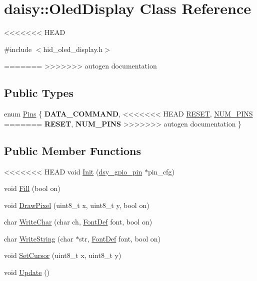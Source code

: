 \hypertarget{classdaisy_1_1_oled_display}{}\section{daisy\+:\+:Oled\+Display Class Reference}
\label{classdaisy_1_1_oled_display}
<<<<<<< HEAD


{\ttfamily \#include $<$hid\+\_\+oled\+\_\+display.\+h$>$}

=======
>>>>>>> autogen documentation
\subsection*{Public Types}
\begin{DoxyCompactItemize}
\item 
enum \hyperlink{classdaisy_1_1_oled_display_ac1e198fa97a58fbe1ff24a06c621c2cf}{Pins} \{ {\bfseries D\+A\+T\+A\+\_\+\+C\+O\+M\+M\+A\+ND}, 
<<<<<<< HEAD
\hyperlink{classdaisy_1_1_oled_display_ac1e198fa97a58fbe1ff24a06c621c2cfa67697d8ab522b9fb584155f838179a4d}{R\+E\+S\+ET}, 
\hyperlink{classdaisy_1_1_oled_display_ac1e198fa97a58fbe1ff24a06c621c2cfaaa81b094c752fe9ddfe072d54003ee1f}{N\+U\+M\+\_\+\+P\+I\+NS}
=======
{\bfseries R\+E\+S\+ET}, 
{\bfseries N\+U\+M\+\_\+\+P\+I\+NS}
>>>>>>> autogen documentation
 \}
\end{DoxyCompactItemize}
\subsection*{Public Member Functions}
\begin{DoxyCompactItemize}
\item 
<<<<<<< HEAD
void \hyperlink{classdaisy_1_1_oled_display_a3db22d3503032fa5f1326009731668e8}{Init} (\hyperlink{structdsy__gpio__pin}{dsy\+\_\+gpio\+\_\+pin} $\ast$pin\+\_\+cfg)
\item 
void \hyperlink{classdaisy_1_1_oled_display_ae0170fddb3afb9b8b008a69ad2578737}{Fill} (bool on)
\item 
void \hyperlink{classdaisy_1_1_oled_display_ad139e5a2b86e1a38cb07693488839a59}{Draw\+Pixel} (uint8\+\_\+t x, uint8\+\_\+t y, bool on)
\item 
char \hyperlink{classdaisy_1_1_oled_display_aeca27f2d60a0aeff4b79b88977d20779}{Write\+Char} (char ch, \hyperlink{struct_font_def}{Font\+Def} font, bool on)
\item 
char \hyperlink{classdaisy_1_1_oled_display_aa88602ddad7cc30b567e1bc3264233a5}{Write\+String} (char $\ast$str, \hyperlink{struct_font_def}{Font\+Def} font, bool on)
\item 
void \hyperlink{classdaisy_1_1_oled_display_a6464c4429950b9d3ebe3ceedc9edb606}{Set\+Cursor} (uint8\+\_\+t x, uint8\+\_\+t y)
\item 
void \hyperlink{classdaisy_1_1_oled_display_a41b556a03d7b340a7d64cc09600b6ddf}{Update} ()
\end{DoxyCompactItemize}


